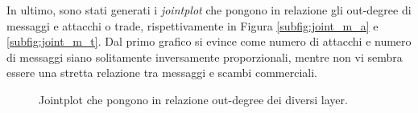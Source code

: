 In ultimo, sono stati generati i \textit{jointplot} che pongono in relazione gli out-degree di messaggi e attacchi o trade, rispettivamente in Figura \ref{subfig:joint_m_a} e \ref{subfig:joint_m_t}. Dal primo grafico si evince come numero di attacchi e numero di messaggi siano solitamente inversamente proporzionali, mentre non vi sembra essere una stretta relazione tra messaggi e scambi commerciali.
\begin{figure}
	\hfill
	\caption{Jointplot che pongono in relazione out-degree dei diversi layer.}
	\label{fig:join_mixed}
\end{figure}

